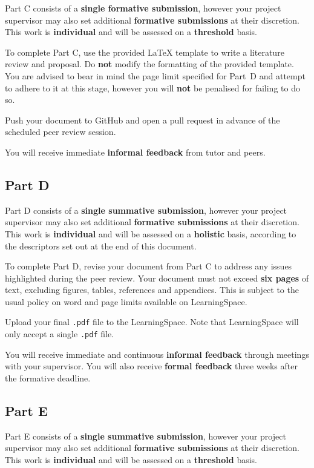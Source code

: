Part C consists of a \textbf{single formative submission},
however your project supervisor may also set additional \textbf{formative submissions} at their discretion.
This work is \textbf{individual} and will be assessed on a \textbf{threshold} basis.

To complete Part C, use the provided LaTeX template to write a literature review and proposal.
Do \textbf{not} modify the formatting of the provided template.
You are advised to bear in mind the page limit specified for Part~D
and attempt to adhere to it at this stage,
however you will \textbf{not} be penalised for failing to do so.

Push your document to GitHub and open a pull request
in advance of the scheduled peer review session.

You will receive immediate \textbf{informal feedback} from tutor and peers.

\subsection*{Part D}

Part D consists of a \textbf{single summative submission},
however your project supervisor may also set additional \textbf{formative submissions} at their discretion.
This work is \textbf{individual} and will be assessed on a \textbf{holistic} basis,
according to the descriptors set out at the end of this document.

To complete Part D, revise your document from Part C
to address any issues highlighted during the peer review.
Your document must not exceed \textbf{six pages} of text,
excluding figures, tables, references and appendices.
This is subject to the usual policy on word and page limits available on LearningSpace.

Upload your final \texttt{.pdf} file to the LearningSpace.
Note that LearningSpace will only accept a single \texttt{.pdf} file.

You will receive immediate and continuous \textbf{informal feedback} through meetings with your supervisor.
You will also receive \textbf{formal feedback} three weeks after the formative deadline.

\subsection*{Part E}

Part E consists of a \textbf{single summative submission},
however your project supervisor may also set additional \textbf{formative submissions} at their discretion.
This work is \textbf{individual} and will be assessed on a \textbf{threshold} basis.

